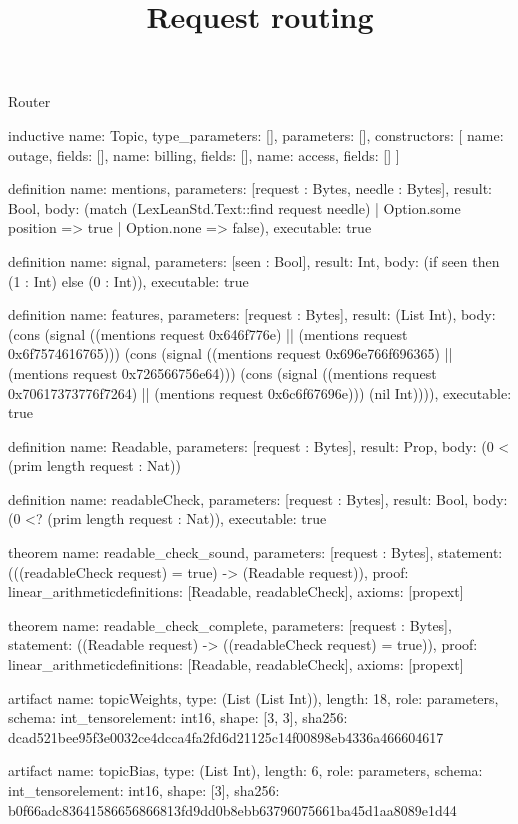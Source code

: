 \begin{lexlean}{Router}
\title{Request routing}
\begin{semanticmodule}
inductive{
  name: Topic,
  type_parameters: [],
  parameters: [],
  constructors: [
    {name: outage, fields: []},
    {name: billing, fields: []},
    {name: access, fields: []}
  ]
}

definition{
  name: mentions,
  parameters: [request : Bytes, needle : Bytes],
  result: Bool,
  body: (match (LexLeanStd.Text::find request needle)
    | Option.some position => true
    | Option.none => false),
  executable: true
}

definition{
  name: signal,
  parameters: [seen : Bool],
  result: Int,
  body: (if seen then (1 : Int) else (0 : Int)),
  executable: true
}

definition{
  name: features,
  parameters: [request : Bytes],
  result: (List Int),
  body: (cons (signal ((mentions request 0x646f776e) || (mentions request 0x6f7574616765))) (cons (signal ((mentions request 0x696e766f696365) || (mentions request 0x726566756e64))) (cons (signal ((mentions request 0x70617373776f7264) || (mentions request 0x6c6f67696e))) (nil Int)))),
  executable: true
}

definition{
  name: Readable,
  parameters: [request : Bytes],
  result: Prop,
  body: (0 < (prim length request : Nat))
}

definition{
  name: readableCheck,
  parameters: [request : Bytes],
  result: Bool,
  body: (0 <? (prim length request : Nat)),
  executable: true
}

theorem{
  name: readable_check_sound,
  parameters: [request : Bytes],
  statement: (((readableCheck request) = true) -> (Readable request)),
  proof: linear_arithmetic{definitions: [Readable, readableCheck]},
  axioms: [propext]
}

theorem{
  name: readable_check_complete,
  parameters: [request : Bytes],
  statement: ((Readable request) -> ((readableCheck request) = true)),
  proof: linear_arithmetic{definitions: [Readable, readableCheck]},
  axioms: [propext]
}

artifact{
  name: topicWeights,
  type: (List (List Int)),
  length: 18,
  role: parameters,
  schema: int_tensor{element: int16, shape: [3, 3]},
  sha256: dcad521bee95f3e0032ce4dcca4fa2fd6d21125c14f00898eb4336a466604617
}

artifact{
  name: topicBias,
  type: (List Int),
  length: 6,
  role: parameters,
  schema: int_tensor{element: int16, shape: [3]},
  sha256: b0f66adc83641586656866813fd9dd0b8ebb63796075661ba45d1aa8089e1d44
}


\end{semanticmodule}
\end{lexlean}
